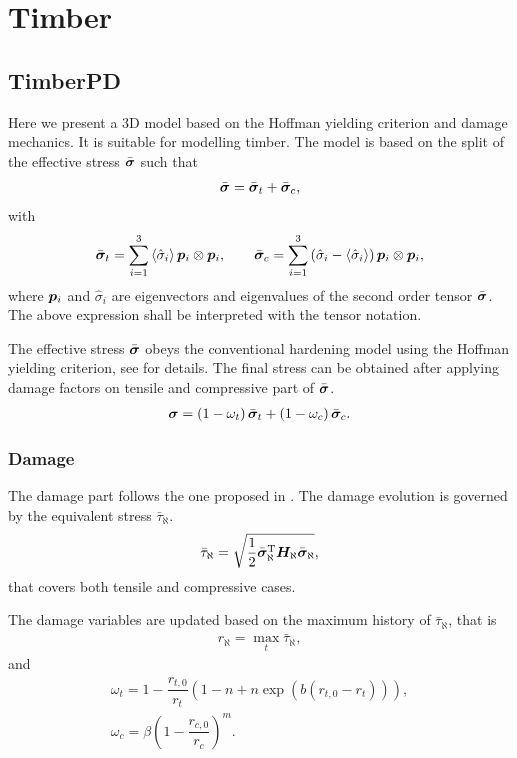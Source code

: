 \chapter{Timber}
\section{TimberPD}
Here we present a 3D model based on the Hoffman yielding criterion and damage mechanics. It is suitable for modelling timber. The model is based on the split of the effective stress $\bar{\bm{\sigma}}$ such that
\begin{gather}
\bar{\bm{\sigma}}=\bar{\bm{\sigma}}_t+\bar{\bm{\sigma}}_c,
\end{gather}
with
\begin{gather}
\bar{\bm{\sigma}}_t=\sum_{i=1}^{3}\left\langle\hat{\sigma}_i\right\rangle\bm{p}_i\otimes\bm{p}_i,\qquad
\bar{\bm{\sigma}}_c=\sum_{i=1}^{3}\left(\hat{\sigma}_i-\left\langle\hat{\sigma}_i\right\rangle\right)\bm{p}_i\otimes\bm{p}_i,
\end{gather}
where $\bm{p}_i$ and $\hat{\sigma}_i$ are eigenvectors and eigenvalues of the second order tensor $\bar{\bm{\sigma}}$. The above expression shall be interpreted with the tensor notation.

The effective stress $\bar{\bm{\sigma}}$ obeys the conventional hardening model using the Hoffman yielding criterion, see  for details. The final stress can be obtained after applying damage factors on tensile and compressive part of $\bar{\bm{\sigma}}$.
\begin{gather}
\bm{\sigma}=\left(1-\omega_t\right)\bar{\bm{\sigma}}_t+\left(1-\omega_c\right)\bar{\bm{\sigma}}_c.
\end{gather}
\subsection{Damage}
The damage part follows the one proposed in \cite{SirumbalZapata2018}. The damage evolution is governed by the equivalent stress $\bar{\tau}_{\aleph}$.
\begin{gather}
\bar{\tau}_{\aleph}=\sqrt{\dfrac{1}{2}\bar{\bm{\sigma}}_\aleph^{\mathrm{T}}\bm{H}_\aleph\bar{\bm{\sigma}}_\aleph},
\end{gather}
that covers both tensile and compressive cases.

The damage variables are updated based on the maximum history of $\bar{\tau}_{\aleph}$, that is
\begin{gather}
r_\aleph=\max_t\bar{\tau}_{\aleph},
\end{gather}
and
\begin{gather}
\omega_t=1-\dfrac{r_{t,0}}{r_t}\left(1-n+n\exp\left(b\left(r_{t,0}-r_t\right)\right)\right),\\
\omega_c=\beta\left(1-\dfrac{r_{c,0}}{r_c}\right)^m.
\end{gather}

